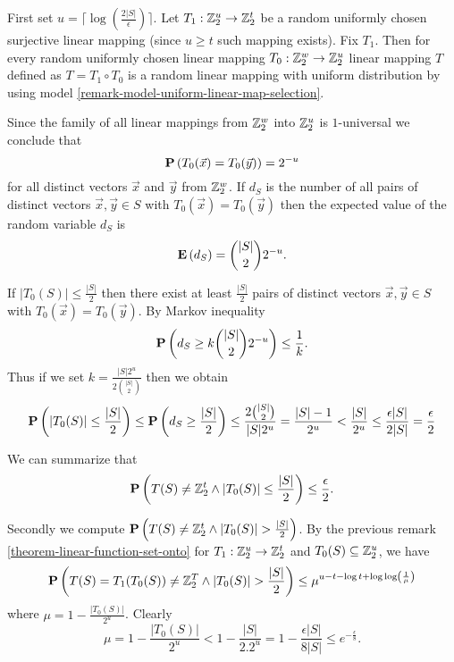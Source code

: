 First set $u = \lceil\log(\frac {2|S|}{\epsilon})\rceil$. Let $T_1: \mathbb{Z}_{2}^{u} \rightarrow \mathbb{Z}_{2}^{t}$ be a random uniformly chosen surjective linear mapping (since $u \geq t$ such mapping exists). Fix $T_1$. Then for every random uniformly chosen linear mapping $T_0: \mathbb{Z}_{2}^{w} \rightarrow \mathbb{Z}_{2}^{u}$ linear mapping $T$ defined as $T = T_1 \circ T_0$  is a random linear mapping with uniform distribution by using model \ref{remark-model-uniform-linear-map-selection}. 

Since the family of all linear mappings from $\mathbb{Z}_{2}^{w}$ into $\mathbb{Z}_{2}^{u}$ is $1$-universal we conclude that \[ \mathbf{P}\left(T_0(\vec{x}) = T_0(\vec{y})\right) = 2 ^ {-u} \] for all distinct vectors $\vec {x}$ and $\vec {y}$ from $\mathbb{Z}_{2}^{w}$. If $d_S$ is the number of  all pairs of distinct vectors $\vec {x},\vec {y}\in S$ with $T_0(\vec {x}) = T_0(\vec {y})$ then the expected value of the random variable $d_S$ is \[ \mathbf{E}\left(d_S\right)= \binom{|S|}{2} 2 ^ {-u} \text{.} \]

If $|T_0(S)| \leq \frac {|S|}{2}$ then there exist at least $\frac {|S|}{2}$ pairs of distinct vectors $\vec {x},\vec {y} \in S$ with $T_0(\vec {x}) = T_0(\vec {y}
)$. By Markov inequality \[ \mathbf{P}\left(d_S \geq k\binom {|S|}{2} 2^{-u}\right) \leq \frac{1}{k} \text{.} \]
Thus if we set $k = \frac {|S|2^u}{2\binom {|S|}{2}}$ then we obtain 
\[ 
	\mathbf{P}\left(|T_0(S)| \leq \frac {|S|}{2}\right) 
		\leq \mathbf{P}\left(d_S \geq \frac {|S|}{2}\right) 
		\leq \frac{2 \binom{|S|}{2}}{|S|2^u} = \frac{|S| - 1}{2^u} < \frac{|S|}{2^u} 
		\leq \frac{\epsilon |S|}{2|S|} = \frac{\epsilon}{2}
\]

We can summarize that
\[ 
\mathbf{P}\left(T(S) \neq \mathbb{Z}_{2}^{t} \wedge |T_0(S)| \leq \frac{|S|}{2}\right) \leq \frac{\epsilon}{2} \text{.}
\]

Secondly we compute $\mathbf{P}\left(T(S) \neq \mathbb{Z}_{2}^{t} \wedge |T_0(S)| > \frac{|S|}{2}\right)$. By the previous remark \ref{theorem-linear-function-set-onto} for $T_1: \mathbb{Z}_{2}^{u} \rightarrow \mathbb{Z}_{2}^{t}$ and $T_0(S) \subseteq \mathbb{Z}_{2}^{u}$, we have
\[
	\mathbf{P}\left(T(S) = T_1(T_0(S)) \neq \mathbb{Z}_{2}^{T} \wedge |T_0(S)| > \frac{|S|}{2}\right) \leq \mu ^ {u - t - \log t  +\log\log \left(\frac{1}{\mu}\right) } 
\]
where $\mu = 1- \frac{|T_0(S)|}{2^u}$. Clearly
\[
\mu = 1 - \frac{|T_0(S)|}{2 ^ u} < 1 - \frac{|S|}{2 . 2 ^ u} = 1 - \frac{\epsilon |S|}{8|S|} \leq e^{-\frac{\epsilon}{8}}
\text{.}
\]

